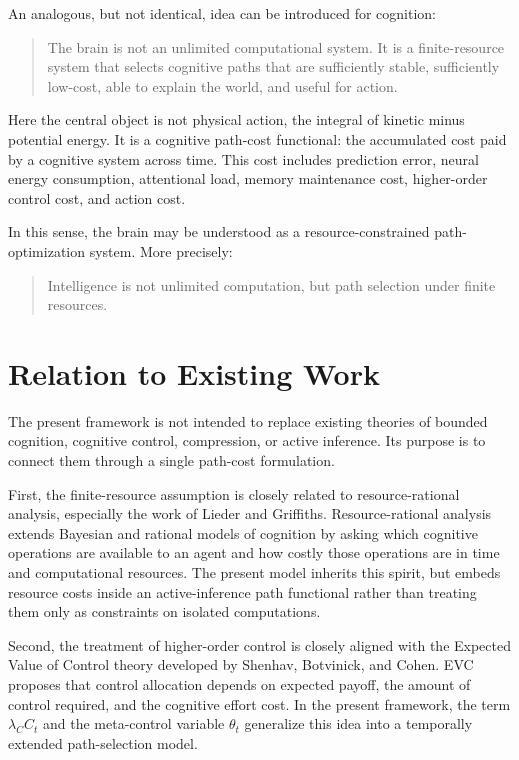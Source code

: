 \documentclass[11pt, a4paper]{article}
\begin{document}
An analogous, but not identical, idea can be introduced for cognition:

\begin{quote}
The brain is not an unlimited computational system. It is a finite-resource system that selects cognitive paths that are sufficiently stable, sufficiently low-cost, able to explain the world, and useful for action.
\end{quote}

Here the central object is not physical action, the integral of kinetic minus potential energy. It is a cognitive path-cost functional: the accumulated cost paid by a cognitive system across time. This cost includes prediction error, neural energy consumption, attentional load, memory maintenance cost, higher-order control cost, and action cost.

In this sense, the brain may be understood as a resource-constrained path-optimization system. More precisely:

\begin{quote}
Intelligence is not unlimited computation, but path selection under finite resources.
\end{quote}

\section{Relation to Existing Work}

The present framework is not intended to replace existing theories of bounded cognition, cognitive control, compression, or active inference. Its purpose is to connect them through a single path-cost formulation.

First, the finite-resource assumption is closely related to resource-rational analysis, especially the work of Lieder and Griffiths. Resource-rational analysis extends Bayesian and rational models of cognition by asking which cognitive operations are available to an agent and how costly those operations are in time and computational resources. The present model inherits this spirit, but embeds resource costs inside an active-inference path functional rather than treating them only as constraints on isolated computations.

Second, the treatment of higher-order control is closely aligned with the Expected Value of Control theory developed by Shenhav, Botvinick, and Cohen. EVC proposes that control allocation depends on expected payoff, the amount of control required, and the cognitive effort cost. In the present framework, the term $\lambda_C C_t$ and the meta-control variable $\theta_t$ generalize this idea into a temporally extended path-selection model.
\end{document}
